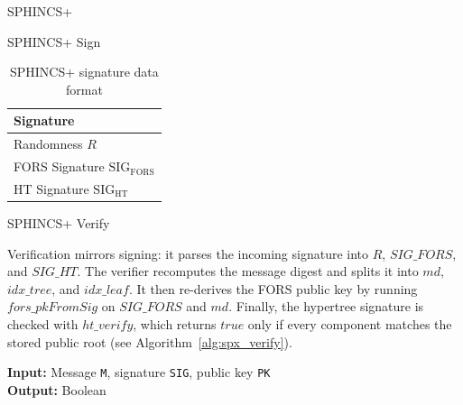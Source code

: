 \documentclass[version=preprint]{iacrcc}
\begin{document}
\begin{section}{SPHINCS+}
\begin{subsection}{SPHINCS+ Sign}
\begin{table}[ht]
  \centering
  \begin{tabular}{|l|}
    \hline
    \textbf{Signature}                         \\ \hline
    Randomness \(R\)                         \\ \hline
    FORS Signature \(\mathrm{SIG}_{\mathrm{FORS}}\)        \\ \hline
    HT Signature \(\mathrm{SIG}_{\mathrm{HT}}\)        \\ \hline
  \end{tabular}
  \caption{SPHINCS+ signature data format}
  \label{tab:slh-dsa-format}
\end{table}



\end{subsection}

\begin{subsection}{SPHINCS+ Verify}

Verification mirrors signing: it parses the incoming signature into \(R\), \(\mathit{SIG\_FORS}\), and \(\mathit{SIG\_HT}\). The verifier recomputes the message digest and splits it into \(\mathit{md}\), \(\mathit{idx\_tree}\), and \(\mathit{idx\_leaf}\). It then re-derives the FORS public key by running \(\mathit{fors\_pkFromSig}\) on \(\mathit{SIG\_FORS}\) and \(\mathit{md}\). Finally, the hypertree signature is checked with \(\mathit{ht\_verify}\), which returns \(\mathit{true}\) only if every component matches the stored public root (see Algorithm~\ref{alg:spx_verify}).

\begin{algorithm}
    \caption{spx\_verify -- Verify a SPHINCS+ signature SIG on a message M using a SPHINCS+ public key PK}
    \label{alg:spx_verify}
    \textbf{Input:} Message \texttt{M}, signature \texttt{SIG}, public key \texttt{PK} \\
    \textbf{Output:} Boolean

    \vspace{0.2cm}


\end{algorithm}
\end{subsection}
\end{section}
\end{document}
